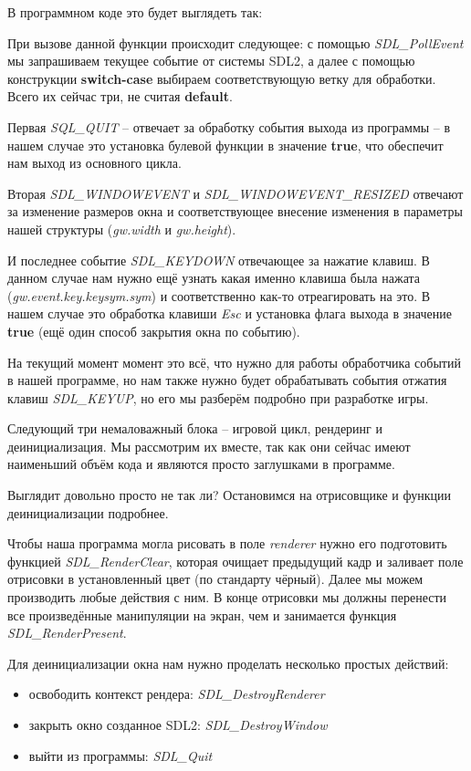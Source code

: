 В программном коде это будет выглядеть так:


При вызове данной функции происходит следующее: с помощью \emph{SDL\_PollEvent} мы запрашиваем текущее 
событие от системы SDL2, а далее с помощью конструкции \textbf{switch-case} выбираем соответствующую ветку 
для обработки. Всего их сейчас три, не считая \textbf{default}. 

Первая \emph{SQL\_QUIT} -- отвечает за обработку события выхода из программы -- в нашем случае это установка 
булевой функции в значение \textbf{true}, что обеспечит нам выход из основного цикла.

Вторая \emph{SDL\_WINDOWEVENT} и \emph{SDL\_WINDOWEVENT\_RESIZED} отвечают за изменение размеров окна и 
соответствующее внесение изменения в параметры нашей структуры (\emph{gw.width} и \emph{gw.height}).

И последнее событие \emph{SDL\_KEYDOWN} отвечающее за нажатие клавиш. В данном случае нам нужно ещё узнать 
какая именно клавиша была нажата (\emph{gw.event.key.keysym.sym}) и соответственно как-то отреагировать на 
это. В нашем случае это обработка клавиши \emph{Esc} и установка флага выхода в значение \textbf{true} 
(ещё один способ закрытия окна по событию).

На текущий момент момент это всё, что нужно для работы обработчика событий в нашей программе, но нам также 
нужно будет обрабатывать события отжатия клавиш \emph{SDL\_KEYUP}, но его мы разберём подробно при 
разработке игры.

Следующий три немаловажный блока -- игровой цикл, рендеринг и деинициализация. Мы рассмотрим их вместе, так 
как они сейчас имеют наименьший объём кода и являются просто заглушками в программе.


Выглядит довольно просто не так ли? Остановимся на отрисовщике и функции деинициализации подробнее.

Чтобы наша программа могла рисовать в поле \emph{renderer} нужно его подготовить функцией 
\emph{SDL\_RenderClear}, которая очищает предыдущий кадр и заливает поле отрисовки в установленный цвет 
(по стандарту чёрный). Далее мы можем производить любые действия с ним. В конце отрисовки мы должны 
перенести все произведённые манипуляции на экран, чем и занимается функция \emph{SDL\_RenderPresent}.

Для деинициализации окна нам нужно проделать несколько простых действий:
\begin{itemize}\itemsep-5pt
    \item освободить контекст рендера: \emph{SDL\_DestroyRenderer}
    \item закрыть окно созданное SDL2: \emph{SDL\_DestroyWindow}
    \item выйти из программы: \emph{SDL\_Quit}
\end{itemize}


